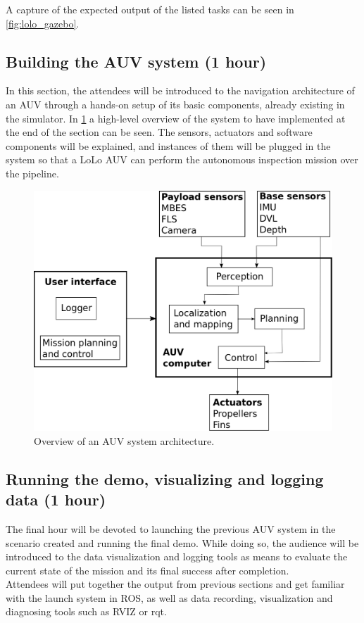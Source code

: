 \documentclass[
10pt, %
a4paper, %
oneside, %
headinclude,footinclude, %
BCOR5mm, %
]{scrartcl}
\begin{document}
A capture of the expected output of the listed tasks can be seen in \ref{fig:lolo_gazebo}.

\subsection{\textbf{Building the AUV system (1 hour)}}
In this section, the attendees will be introduced to the navigation architecture of an AUV through a hands-on setup of its basic components, already existing in the simulator.
In \ref{fig:auv_system} a high-level overview of the system to have implemented at the end of the section can be seen.
The sensors, actuators and software components will be explained, and instances of them will be plugged in the system so that a LoLo AUV can perform the autonomous inspection mission over the pipeline.

\begin{figure}[h]
    \centering
    \includegraphics[width=0.9\linewidth]{Figures/auv_system.png}
    \caption{Overview of an AUV system architecture.}
\label{fig:auv_system}
\end{figure}


\subsection{\textbf{Running the demo, visualizing and logging data (1 hour)}}
The final hour will be devoted to launching the previous AUV system in the scenario created and running the final demo.
While doing so, the audience will be introduced to the data visualization and logging tools as means to evaluate the current state of the mission and its final success after completion.
\\
Attendees will put together the output from previous sections and get familiar with the launch system in ROS, as well as data recording, visualization and diagnosing tools such as RVIZ or rqt.
\end{document}
